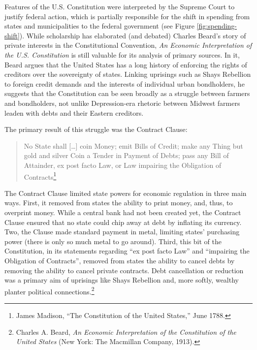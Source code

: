 \documentclass[12pt,oneside]{psthesis}
\begin{document}
Features of the U.S. Constitution were interpreted by the Supreme Court to justify federal action, which is partially responsible for the shift in spending from states and municipalities to the federal government (see Figure \ref{fig:spending-shift}).
While scholarship has elaborated (and debated) Charles Beard's story of private interests in the Constitutional Convention, \emph{An Economic Interpretation of the U.S. Constitution} is still valuable for its analysis of primary sources.
In it, Beard argues that the United States has a long history of enforcing the rights of creditors over the sovereignty of states.
Linking uprisings such as Shays Rebellion to foreign credit demands and the interests of individual urban bondholders, he suggests that the Constitution can be seen broadly as a struggle between farmers and bondholders, not unlike Depression-era rhetoric between Midwest farmers leaden with debts and their Eastern creditors.

The primary result of this struggle was the Contract Clause:
\begin{quote}
No State shall {[}\ldots{]} coin Money; emit Bills of Credit; make any Thing but gold and silver Coin a Tender in Payment of Debts; pass any Bill of Attainder, ex post facto Law, or Law impairing the Obligation of Contracts\footnote{James Madison, ``The Constitution of the United States,'' June 1788.}
\end{quote}
The Contract Clause limited state powers for economic regulation in three main ways.
First, it removed from states the ability to print money, and, thus, to overprint money.
While a central bank had not been created yet, the Contract Clause ensured that no state could chip away at debt by inflating its currency.
Two, the Clause made standard payment in metal, limiting states' purchasing power (there is only so much metal to go around).
Third, this bit of the Constitution, in its statements regarding ``ex post facto Law'' and ``impairing the Obligation of Contracts'', removed from states the ability to cancel debts by removing the ability to cancel private contracts.
Debt cancellation or reduction was a primary aim of uprisings like Shays Rebellion and, more softly, wealthy planter political connections.\footnote{Charles A. Beard, \emph{An Economic Interpretation of the Constitution of the United States} (New York: The Macmillan Company, 1913).}
\end{document}
